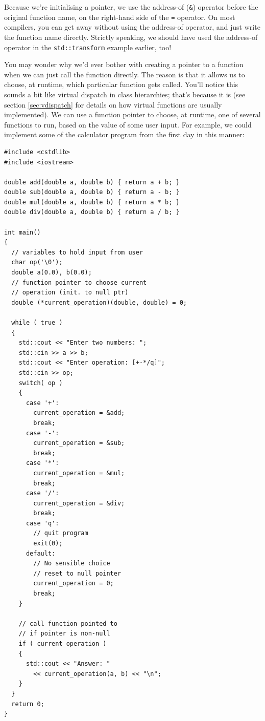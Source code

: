 \documentclass[a4paper]{scrartcl}
\begin{document}
Because we're initialising a pointer, we use the address-of (\verb|&|) operator before the original function name, on the right-hand side of the \verb|=| operator. On most compilers, you can get away without using the address-of operator, and just write the function name directly. Strictly speaking, we should have used the address-of operator in the \texttt{std::transform} example earlier, too!

You may wonder why we'd ever bother with creating a pointer to a function when we can just call the function directly. The reason is that it allows us to choose, at runtime, which particular function gets called. You'll notice this sounds a bit like virtual dispatch in class hierarchies; that's because it is (see section \ref{sec:vdispatch} for details on how virtual functions are usually implemented). We can use a function pointer to choose, at runtime, one of several functions to run, based on the value of some user input. For example, we could implement some of the calculator program from the first day in this manner:

\begin{verbatim}
#include <cstdlib>
#include <iostream>

double add(double a, double b) { return a + b; }
double sub(double a, double b) { return a - b; }
double mul(double a, double b) { return a * b; }
double div(double a, double b) { return a / b; }

int main()
{
  // variables to hold input from user
  char op('\0');
  double a(0.0), b(0.0);
  // function pointer to choose current
  // operation (init. to null ptr)
  double (*current_operation)(double, double) = 0;

  while ( true )
  {
    std::cout << "Enter two numbers: ";
    std::cin >> a >> b;
    std::cout << "Enter operation: [+-*/q]";
    std::cin >> op;
    switch( op )
    {
      case '+':
        current_operation = &add;
        break;
      case '-':
        current_operation = &sub;
        break;
      case '*':
        current_operation = &mul;
        break;
      case '/':
        current_operation = &div;
        break;
      case 'q':
        // quit program
        exit(0);
      default:
        // No sensible choice
        // reset to null pointer
        current_operation = 0;
        break;
    }

    // call function pointed to
    // if pointer is non-null
    if ( current_operation )
    {
      std::cout << "Answer: "
        << current_operation(a, b) << "\n";
    }
  }
  return 0;
}
\end{verbatim}
\end{document}
